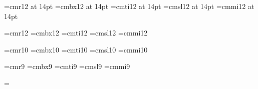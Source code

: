 %
%
\font\fourteenrm=cmr12 at 14pt
\font\fourteenbf=cmbx12 at 14pt
\font\fourteenit=cmti12 at 14pt
\font\fourteensl=cmsl12 at 14pt
\font\fourteenmi=cmmi12 at 14pt

\font\twelverm=cmr12
\font\twelvebf=cmbx12
\font\twelveit=cmti12
\font\twelvesl=cmsl12
\font\twelvemi=cmmi12

\font\tenrm=cmr10
\font\tenbf=cmbx10
\font\tenit=cmti10
\font\tensl=cmsl10
\font\tenmi=cmmi10

\font\ninerm=cmr9
\font\ninebf=cmbx9
\font\nineit=cmti9
\font\ninesl=cmsl9
\font\ninemi=cmmi9

\def\title{
  \let\rm=\fourteenrm \let\bf=\fourteenbf
  \let\it=\fourteenit \let\sl=\fourteensl
  \let\mi=\fourteenmi
  \bigskip
  \bf}
\def\section{
  \let\rm=\twelverm \let\bf=\twelvebf
  \let\it=\twelveit \let\sl=\twelvesl
  \let\mi=\twelvemi
  \bigskip
  \bf}
\def\body{
  \let\rm=\tenrm \let\bf=\tenbf
  \let\it=\tenit \let\sl=\tensl
  \let\mi=\tenmi
  \medskip
  \rm}
\def\minor{
  \let\rm=\ninerm \let\bf=\ninebf
  \let\it=\nineit \let\sl=\ninesl
  \let\mi=\ninemi
  \bigskip
  \rm}

\hsize 85mm
\vsize 3000mm
\hoffset -16mm
\voffset -18mm

\footline = {}

\bigskip

\bigskip
